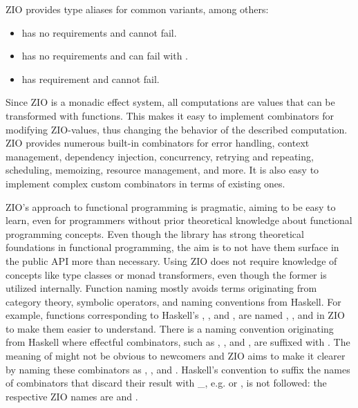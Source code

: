 ZIO provides type aliases for common variants, among others:
\begin{itemize}
    \item {} has no requirements and cannot fail.
    \item {} has no requirements and can fail with .
    \item {} has requirement  and cannot fail.
\end{itemize}

Since ZIO is a monadic effect system, all computations are values that can be transformed with functions. This makes it easy to implement combinators for modifying ZIO-values, thus changing the behavior of the described computation. ZIO provides numerous built-in combinators for error handling, context management, dependency injection, concurrency, retrying and repeating, scheduling, memoizing, resource management, and more. It is also easy to implement complex custom combinators in terms of existing ones.

ZIO's approach to functional programming is pragmatic, aiming to be easy to learn, even for programmers without prior theoretical knowledge about functional programming concepts. Even though the library has strong theoretical foundations in functional programming, the aim is to not have them surface in the public API more than necessary. Using ZIO does not require knowledge of concepts like type classes or monad transformers, even though the former is utilized internally. Function naming mostly avoids terms originating from category theory, symbolic operators, and naming conventions from Haskell. For example, functions corresponding to Haskell's , , and , are named , , and  in ZIO to make them easier to understand. There is a naming convention originating from Haskell where effectful combinators, such as , , and , are suffixed with . The meaning of  might not be obvious to newcomers and ZIO aims to make it clearer by naming these combinators as , , and .
Haskell's convention to suffix the names of combinators that discard their result with \_, e.g.  or , is not followed: the respective ZIO names are  and .

